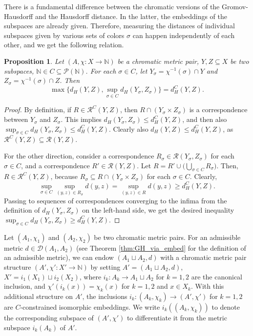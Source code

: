 \documentclass[8pt,a4paper,oneside,english,english]{article}
\theoremstyle{plain}
\theoremstyle
{plain}
\newtheorem{proposition}[theorem]{Proposition}%
\theoremstyle{definition}
\newcommand{\N}{\mathbb{N}}
\newcommand{\MP}[1]{(A_{#1},\chi_{#1})}
\begin{document}
There is a fundamental difference between the chromatic versions of the Gromov-Hausdorff and the Hausdorff distance. In the latter, the embeddings of the subspaces are already given. Therefore, measuring the distances of individual subspaces given by various sets of colors $\sigma$ can happen independently of each other, and we get the following relation.

\begin{proposition}\label{prop:d_H_rewritten}
Let $(A, \chi\colon X\rightarrow \N)$ be a chromatic metric pair, $Y, Z\subseteq X$ be two subspaces, $\N \in C\subseteq \mathcal{P}(\N)$. For each $\sigma\in C$, let $Y_\sigma=\chi^{-1}(\sigma)\cap Y$ and $Z_\sigma=\chi^{-1}(\sigma)\cap Z$.
    Then \[
        \max\{d_H(Y,Z),\sup_{\sigma\in C} d_H(Y_\sigma, Z_\sigma)\} = d_H^C(Y, Z).
    \]
\end{proposition}

\begin{proof}
    By definition, if $R\in \mathcal R^C(Y,Z)$, then $R\cap (Y_\sigma \times Z_\sigma)$ is a correspondence between $Y_\sigma$ and $Z_\sigma$. This implies $d_H(Y_\sigma, Z_\sigma) \leq d_H^C(Y, Z)$, and then also $\sup_{\sigma\in C} d_H(Y_\sigma, Z_\sigma) \leq d_H^C(Y, Z)$. Clearly also $d_H(Y, Z)\leq d_H^C(Y,Z)$, as $\mathcal R^C(Y,Z)\subseteq \mathcal R(Y,Z)$.

    For the other direction, consider a correspondence $R_\sigma \in \mathcal{R}(Y_\sigma, Z_\sigma)$ for each $\sigma \in C$, and a correspondence $R'\in\mathcal R(Y,Z)$. Let $R=R'\cup\big(\bigcup_{\sigma\in C}R_\sigma\big)$.
    Then, $R\in \mathcal R^C(Y,Z)$, because $R_\sigma \subseteq R\cap(Y_\sigma \times Z_\sigma)$ for each $\sigma\in C$.  Clearly, \[
        \sup_{\sigma\in C}\sup_{(y, z) \in R_\sigma} d(y, z)
        = \sup_{(y, z)\in R} d(y, z)
        \geq d_H^C(Y, Z).
    \]
    Passing to sequences of correspondences converging to the infima from the definition of $d_H(Y_\sigma, Z_\sigma)$ on the left-hand side, we get the desired inequality $\sup_{\sigma\in C} d_H(Y_\sigma, Z_\sigma) \geq d_H^C(Y, Z)$.
\end{proof}

Let $\MP{1}$ and $\MP{2}$ be two chromatic metric pairs. For an admissible metric $d\in\mathcal D(A_1,A_2)$ (see Theorem \ref{thm:GH_via_embed} for the definition of an admissible metric), we can endow $(A_1\sqcup A_2,d)$ with a chromatic metric pair structure $(A', \chi'\colon X' \to \N)$ by setting $A'=(A_1\sqcup A_2,d)$, $X'=i_1(X_1)\sqcup i_2(X_2)$, where $i_k\colon A_k\to A_1\sqcup A_2$ for $k=1,2$ are the canonical inclusion, and $\chi'(i_k(x))=\chi_k(x)$ for $k=1,2$ and $x\in X_k$. With this additional structure on $A'$, the inclusions $i_k\colon \MP{k}\to (A',\chi')$ for $k=1,2$ are $C$-constrained isomorphic embeddings. We write $i_k(\MP{k})$ to denote the corresponding subspace of $(A',\chi')$ to differentiate it from the metric subspace $i_k(A_k)$ of $A'$.
\end{document}

